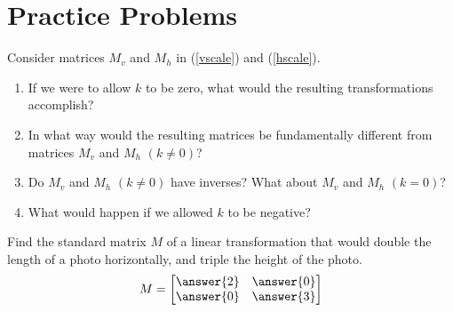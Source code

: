 \documentclass{ximera}
\begin{document}
\section*{Practice Problems}
\begin{problem}\label{prob:k0}
Consider matrices $M_v$ and $M_h$ in (\ref{vscale}) and (\ref{hscale}).  
\begin{enumerate}
\item
If we were to allow $k$ to be zero, what would the resulting transformations accomplish?  
\item In what way would the resulting matrices be fundamentally different from matrices $M_v$ and $M_h$ $(k\neq 0)$?  
\item Do $M_v$ and $M_h$ $(k\neq 0)$ have inverses?  What about $M_v$ and $M_h$ $(k= 0)$?  
\item What would happen if we allowed $k$ to be negative?
\end{enumerate}
\end{problem}

\begin{problem}\label{prob:matrixlintrans} Find the standard matrix $M$ of a linear transformation that would double the length of a photo horizontally, and triple the height of the photo.
$$M=\begin{bmatrix}\answer{2} & \answer{0}\\\answer{0} & \answer{3}\end{bmatrix}$$
\end{problem}
\end{document}
